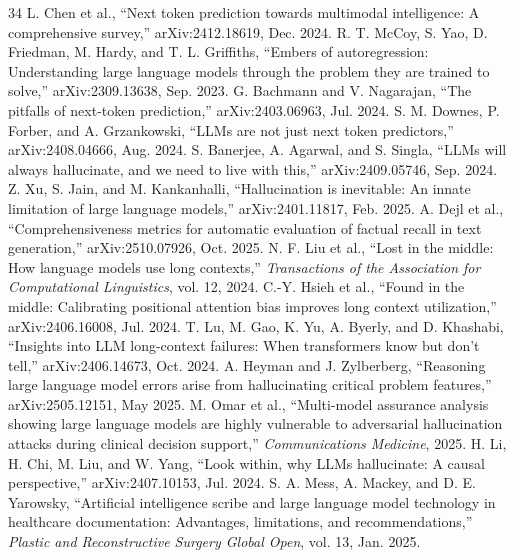 \documentclass[10pt,conference]{IEEEtran}
\begin{document}
\balance
\begin{thebibliography}{34}
 L. Chen et al., ``Next token prediction towards multimodal intelligence: A comprehensive survey,'' arXiv:2412.18619, Dec. 2024.
 R. T. McCoy, S. Yao, D. Friedman, M. Hardy, and T. L. Griffiths, ``Embers of autoregression: Understanding large language models through the problem they are trained to solve,'' arXiv:2309.13638, Sep. 2023.
 G. Bachmann and V. Nagarajan, ``The pitfalls of next-token prediction,'' arXiv:2403.06963, Jul. 2024.
 S. M. Downes, P. Forber, and A. Grzankowski, ``LLMs are not just next token predictors,'' arXiv:2408.04666, Aug. 2024.
 S. Banerjee, A. Agarwal, and S. Singla, ``LLMs will always hallucinate, and we need to live with this,'' arXiv:2409.05746, Sep. 2024.
 Z. Xu, S. Jain, and M. Kankanhalli, ``Hallucination is inevitable: An innate limitation of large language models,'' arXiv:2401.11817, Feb. 2025.
 A. Dejl et al., ``Comprehensiveness metrics for automatic evaluation of factual recall in text generation,'' arXiv:2510.07926, Oct. 2025.
 N. F. Liu et al., ``Lost in the middle: How language models use long contexts,'' \emph{Transactions of the Association for Computational Linguistics}, vol. 12, 2024.
 C.-Y. Hsieh et al., ``Found in the middle: Calibrating positional attention bias improves long context utilization,'' arXiv:2406.16008, Jul. 2024.
 T. Lu, M. Gao, K. Yu, A. Byerly, and D. Khashabi, ``Insights into LLM long-context failures: When transformers know but don't tell,'' arXiv:2406.14673, Oct. 2024.
 A. Heyman and J. Zylberberg, ``Reasoning large language model errors arise from hallucinating critical problem features,'' arXiv:2505.12151, May 2025.
 M. Omar et al., ``Multi-model assurance analysis showing large language models are highly vulnerable to adversarial hallucination attacks during clinical decision support,'' \emph{Communications Medicine}, 2025.
 H. Li, H. Chi, M. Liu, and W. Yang, ``Look within, why LLMs hallucinate: A causal perspective,'' arXiv:2407.10153, Jul. 2024.
 S. A. Mess, A. Mackey, and D. E. Yarowsky, ``Artificial intelligence scribe and large language model technology in healthcare documentation: Advantages, limitations, and recommendations,'' \emph{Plastic and Reconstructive Surgery Global Open}, vol. 13, Jan. 2025.

\end{thebibliography}
\end{document}
